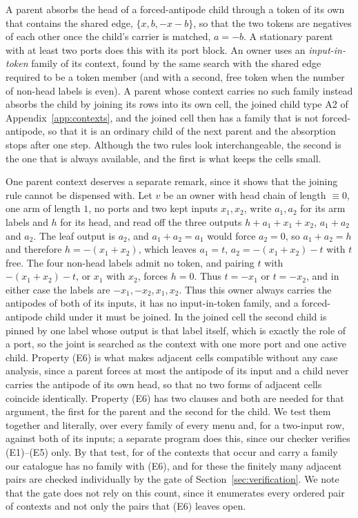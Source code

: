 \documentclass[11pt,a4paper]{article}
\theoremstyle{plain}
\theoremstyle{definition}
\theoremstyle{remark}
\begin{document}
A parent absorbs the head of a forced-antipode child through a token of its
own that contains the shared edge, $\{x,b,-x-b\}$, so that the two tokens are
negatives of each other once the child's carrier is matched, $a=-b$.  A
stationary parent with at least two ports does this with its port block.  An
owner uses an \emph{input-in-token} family of its context, found by the
same search with the shared edge required to be a token member (and with a
second, free token when the number of non-head labels is even).  A parent
whose context carries no such family instead absorbs the child by joining its
rows into its own cell, the joined child type A2 of
Appendix~\ref{app:contexts}, and the joined cell then has a family that is
not forced-antipode, so that it is an ordinary child of the next parent and
the absorption stops after one step.  Although the two rules look
interchangeable, the second is the one that is always available, and the
first is what keeps the cells small.

One parent context deserves a separate remark, since it shows that the
joining rule cannot be dispensed with.  Let $v$ be an owner with head chain
of length $\equiv 0$, one arm of length $1$, no ports and two kept inputs
$x_1,x_2$, write $a_1,a_2$ for its arm labels and $h$ for its head, and read
off the three outputs $h+a_1+x_1+x_2$, $a_1+a_2$ and $a_2$.  The leaf output
is $a_2$, and $a_1+a_2=a_1$ would force $a_2=0$, so $a_1+a_2=h$ and therefore
$h=-(x_1+x_2)$, which leaves $a_1=t$, $a_2=-(x_1+x_2)-t$ with $t$ free.  The
four non-head labels admit no token, and pairing $t$ with $-(x_1+x_2)-t$, or
$x_1$ with $x_2$, forces $h=0$.  Thus $t=-x_1$ or $t=-x_2$, and in
either case the labels are $-x_1,-x_2,x_1,x_2$.  Thus this owner always
carries the antipodes of both of its inputs, it has no input-in-token family,
and a forced-antipode child under it must be joined.  In the joined cell the
second child is pinned by one label whose output is that label itself, which
is exactly the role of a port, so the joint is searched as the context with
one more port and one active child.  Property (E6) is what makes adjacent cells compatible without any
case analysis, since a parent forces at most the antipode of its input and a
child never carries the antipode of its own head, so that no two forms of
adjacent cells coincide identically.  Property (E6) has two clauses and both
are needed for that argument, the first for the parent and the second for the
child.  We test them together and literally, over every family of every menu
and, for a two-input row, against both of its inputs; a separate program does
this, since our checker verifies (E1)--(E5) only.  By that test, for
\NumNotEsixContexts{} of the \NumEsixDenom{} contexts that occur and carry a
family our catalogue has no family with (E6), and for these the finitely many
adjacent pairs are checked individually by the gate of
Section~\ref{sec:verification}.  We note that the gate does not rely on this
count, since it enumerates every ordered pair of contexts and not only the
pairs that (E6) leaves open.
\end{document}
